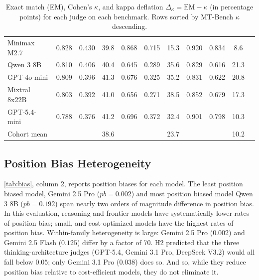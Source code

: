 \documentclass[11pt]{article}
\begin{document}
\begin{table}[t]
{\begin{tabular}{lcccccccccc}
Minimax M2.7      & 0.828 & 0.430 & 39.8 & 0.868 & 0.715 & 15.3 & 0.920 & 0.834 &  8.6 \\
Qwen 3 8B         & 0.810 & 0.406 & 40.4 & 0.645 & 0.289 & 35.6 & 0.829 & 0.616 & 21.3 \\
GPT-4o-mini       & 0.809 & 0.396 & 41.3 & 0.676 & 0.325 & 35.2 & 0.831 & 0.622 & 20.8 \\
Mixtral 8x22B     & 0.803 & 0.392 & 41.0 & 0.656 & 0.271 & 38.5 & 0.852 & 0.679 & 17.3 \\
GPT-5.4-mini      & 0.788 & 0.376 & 41.2 & 0.696 & 0.372 & 32.4 & 0.901 & 0.798 & 10.3 \\
\midrule
Cohort mean       &       &       & 38.6 &       &       & 23.7 &       &       & 10.2 \\
\bottomrule
\end{tabular}}
\caption{\footnotesize Exact match (EM), Cohen's $\kappa$, and kappa deflation
$\Delta_\kappa = \text{EM} - \kappa$ (in percentage points) for each
judge on each benchmark. Rows sorted by MT-Bench $\kappa$ descending.}
\label{tab:deflation}
\end{table}


\subsection{Position Bias Heterogeneity}



\autoref{tab:bias}, column 2, reports position biases for each model. The least position biased model, Gemini 2.5 Pro ($pb = 0.002$) and most position biased model Qwen 3 8B ($pb = 0.192$) span nearly two orders of magnitude difference in position bias. In this evaluation, reasoning and frontier models have systematically lower rates of position bias; small, and cost-optimized models have the highest rates of position bias. Within-family heterogeneity is large: Gemini 2.5 Pro ($0.002$) and Gemini 2.5 Flash ($0.125$) differ by a factor of $70$. H2 predicted that the three thinking-architecture judges (GPT-5.4, Gemini 3.1 Pro, DeepSeek V3.2) would all fall below $0.05$; only Gemini 3.1 Pro ($0.038$) does so. And so, while they reduce position bias relative to cost-efficient models, they do not eliminate it. 
\end{document}
